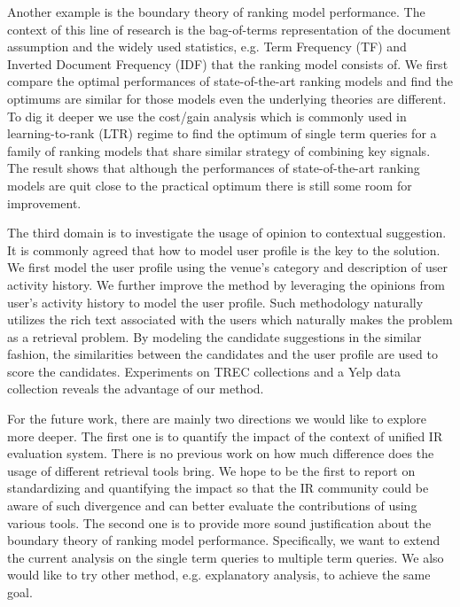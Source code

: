 Another example is the boundary theory of ranking model performance. 
The context of this line of research is the bag-of-terms representation of 
the document assumption and the widely used statistics, e.g. Term Frequency 
(TF) and Inverted Document Frequency (IDF) 
that the ranking model consists of. We first compare the optimal 
performances of state-of-the-art ranking models and find the optimums 
are similar for those models even the underlying theories are different. 
To dig it deeper we use the cost/gain analysis which is commonly used in 
learning-to-rank (LTR) regime to find the optimum of single term queries for 
a family of ranking models that share similar strategy of combining key 
signals. The result shows that although the performances of state-of-the-art 
ranking models are quit close to the practical optimum there is still some 
room for improvement.

The third domain is to investigate the usage of opinion to contextual 
suggestion. It is commonly agreed that how to model user profile is the key 
to the solution. We first model the user profile using the venue's category 
and description of user activity history. We further improve the 
method by leveraging the opinions from user's activity history to model the 
user profile. Such methodology naturally utilizes the rich text associated 
with the users which naturally makes the problem as a retrieval problem. 
By modeling the candidate suggestions in the similar fashion, 
the similarities between the candidates and the user profile are used to score 
the candidates. Experiments on TREC collections and a 
Yelp data collection reveals the advantage of our method.

For the future work, there are mainly two directions we would like to explore more deeper. 
The first one is to quantify the impact of the context of unified 
IR evaluation system. There is no previous work on how much difference does 
the usage of different retrieval tools bring.
We hope to be the first to report on standardizing and quantifying the 
impact so that the IR community could be aware of such divergence and can 
better evaluate the contributions of using various tools. 
The second one is to provide more sound justification about the boundary 
theory of ranking model performance. Specifically, we want to extend the 
current analysis on the single term queries to multiple term queries. 
We also would like to try other method, e.g. explanatory analysis, 
to achieve the same goal.















